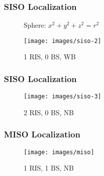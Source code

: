 \documentclass{beamer}
\begin{document}
\begin{frame}
	\frametitle{SISO Localization}
	\begin{minipage}{.6\linewidth}
		\begin{figure}
			\centering
			\begin{adjustbox}{scale=.6}
			\end{adjustbox}
			\caption{Sphere:
				${x^2} + {y^2} + {z^2} = r^2$
			}
		\end{figure}
		
	\end{minipage}\hfill
	\begin{minipage}{.3\linewidth}
		\begin{figure}
			\centering
			\texttt{[image: images/siso-2]}
			\caption{1 RIS, 0 BS, WB}
			\label{fig:siso-2}
		\end{figure}
	\end{minipage}
\end{frame}


\begin{frame}
	\frametitle{SISO Localization}
	\begin{minipage}{.6\linewidth}
		

		
	\end{minipage}\hfill
	\begin{minipage}{.4\linewidth}
		\begin{figure}
			\centering
			\texttt{[image: images/siso-3]}
			\caption{2 RIS, 0 BS, NB}
			\label{fig:siso-3}
		\end{figure}
	\end{minipage}
\end{frame}



\begin{frame}
	\frametitle{MISO Localization}
	\begin{minipage}{.5\linewidth}
		
		
		
	\end{minipage}\hfill
	\begin{minipage}{.45\linewidth}
		\begin{figure}
			\centering
			\texttt{[image: images/miso]}
			\caption{1 RIS, 1 BS, NB}
			\label{fig:miso}
		\end{figure}
	\end{minipage}
\end{frame}
\end{document}
